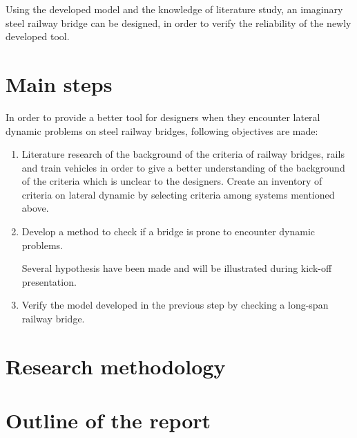 Using the developed model and the knowledge of literature study, an imaginary steel railway bridge can be designed, in order to verify the reliability of the newly developed tool. 

\section{Main steps}

In order to provide a better tool for designers when they encounter lateral dynamic problems on steel railway bridges, following objectives are made:

\begin{enumerate}

\item Literature research of the background of the criteria of railway bridges, rails and train vehicles in order to give a better understanding of the background of the criteria which is unclear to the designers.  Create an inventory of criteria on lateral dynamic by selecting criteria among systems mentioned above. 

\item Develop a method to check if a bridge is prone to encounter dynamic problems.

Several hypothesis have been made and will be illustrated during kick-off presentation.

\item Verify the model developed in the previous step by checking a long-span railway bridge. 

\end{enumerate}

\section{Research methodology}
\section{Outline of the report}

